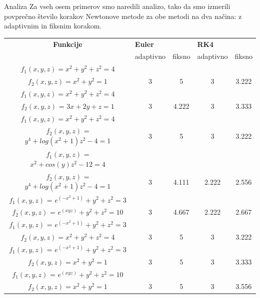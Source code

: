 \documentclass{beamer}
\begin{document}
	\begin{frame}{Analiza}
		Za vseh osem primerov smo naredili analizo, tako da smo izmerili povpre\v{c}no \v{s}tevilo korakov Newtonove metode za obe metodi na dva na\v{c}ina: z adaptivnim in fiksnim korakom.
	\end{frame}
	\begin{frame}
 \begin{tabular}{|c | c | c | c | c |} 
 \hline
 \textbf{Funkcije} &\multicolumn{2}{|l|}{\textbf{Euler}} &\multicolumn{2}{|l|}{\textbf{RK4}}\\                
  \small &adaptivno & fiksno & adaptivno & fiksno \\ 
 \hline
 \tiny{}$f_{1}(x,y,z)=x^{2} + y^{2}+ z^{2}=4$ & & & &\\ 
 \tiny{}$f_{2}(x,y,z)=x^{2} + y^{2}    =1$  & 3 & 5 & 3 & 3.222 \\
 \hline
 \tiny{}$f_{1}(x,y,z)=x^{2} + y^{2}+ z^{2}=4$ & & & &\\ 
 \tiny{}$f_{2}(x,y,z)$ = $3x + 2y + z = 1$  & 3 & 4.222 & 3 & 3.333 \\
 \hline
 \tiny{}$f_{1}(x,y,z)=x^{2} + y^{2}+ z^{2}=4$ & & & &\\ 
 \tiny{}$f_{2}(x,y,z)$ = $y^4 + log(x^2 + 1)z^2 - 4 = 1$  & 3 & 5 & 3 & 3.222 \\
 \hline
 \tiny{}$f_{1}(x,y,z)$ = $x^2 + cos(y)z^2 - 12 = 4$ & & & &\\ 
\tiny{}$f_{2}(x,y,z)$ = $y^4 + log(x^2 + 1)z^2 - 4 = 1$  & 3 & 4.111 & 2.222 & 2.556 \\
 \hline
 \tiny{}$f_{1}(x,y,z)$ = $e^{(-x^{2}+1)}+y^{2}+z^{2} = 3$ & & & &\\ 
 \tiny{}$f_{2}(x,y,z)$ = $e^{(xyz)}+y^{2}+z^{2} = 10$  & 3 & 4.667 & 2.222 & 2.667 \\
 \hline
 \tiny{}$f_{1}(x,y,z)$ = $e^{(-x^{2}+1)}+y^{2}+z^{2} = 3$ & & & &\\ 
 \tiny{}$f_{2}(x,y,z)=x^{2} + y^{2}+ z^{2}=4$  & 3 & 5 & 3 & 3.222 \\
 \hline
 \tiny{}$f_{1}(x,y,z)$ = $e^{(-x^{2}+1)}+y^{2}+z^{2} = 3$ & & & &\\ 
  \tiny{}$f_{2}(x,y,z)=x^{2} + y^{2}    =1$  & 3 & 5 & 3 & 3.333 \\
  \hline
\tiny{}$f_{1}(x,y,z)$ = $e^{(xyz)}+y^{2}+z^{2} = 10$ & & & &\\ 
 \tiny{}$f_{2}(x,y,z)=x^{2} + y^{2}    =1$  & 3 & 5 & 3 & 3.556 \\
  \hline
\end{tabular}
	\end{frame}
	
\end{document}
